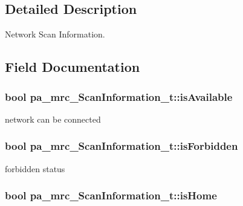 \subsection{Detailed Description}
Network Scan Information. 

\subsection{Field Documentation}
\subsubsection[{\texorpdfstring{is\+Available}{isAvailable}}]{\setlength{\rightskip}{0pt plus 5cm}bool pa\+\_\+mrc\+\_\+\+Scan\+Information\+\_\+t\+::is\+Available}\hypertarget{structpa__mrc___scan_information__t_a231ac56bf18787f7cf7489a4fe7814b3}{}\label{structpa__mrc___scan_information__t_a231ac56bf18787f7cf7489a4fe7814b3}


network can be connected 

\subsubsection[{\texorpdfstring{is\+Forbidden}{isForbidden}}]{\setlength{\rightskip}{0pt plus 5cm}bool pa\+\_\+mrc\+\_\+\+Scan\+Information\+\_\+t\+::is\+Forbidden}\hypertarget{structpa__mrc___scan_information__t_a0a6c47a58234e441ce95202247b85abb}{}\label{structpa__mrc___scan_information__t_a0a6c47a58234e441ce95202247b85abb}


forbidden status 

\subsubsection[{\texorpdfstring{is\+Home}{isHome}}]{\setlength{\rightskip}{0pt plus 5cm}bool pa\+\_\+mrc\+\_\+\+Scan\+Information\+\_\+t\+::is\+Home}\hypertarget{structpa__mrc___scan_information__t_a8107e86b1981d8cffa16c41f1d759ac9}{}\label{structpa__mrc___scan_information__t_a8107e86b1981d8cffa16c41f1d759ac9}


